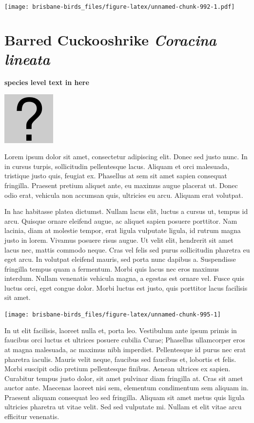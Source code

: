 \documentclass[]{book}
\let\origfigure\figure
\let\endorigfigure\endfigure
\renewenvironment{figure}[1][2] {
  \expandafter\origfigure\expandafter[H]
} {
  \endorigfigure
}
\begin{document}
\texttt{[image: brisbane-birds\_files/figure-latex/unnamed-chunk-992-1.pdf]}

\section{\texorpdfstring{Barred Cuckooshrike \emph{Coracina
lineata}}{Barred Cuckooshrike Coracina lineata}}\label{barred-cuckooshrike-coracina-lineata}

\textbf{species level text in here}

\begin{figure}
\centering
\includegraphics{assets/missing.png}
\caption{No image for species}
\end{figure}

Lorem ipsum dolor sit amet, consectetur adipiscing elit. Donec sed justo
nunc. In in cursus turpis, sollicitudin pellentesque lacus. Aliquam et
orci malesuada, tristique justo quis, feugiat ex. Phasellus at sem sit
amet sapien consequat fringilla. Praesent pretium aliquet ante, eu
maximus augue placerat ut. Donec odio erat, vehicula non accumsan quis,
ultricies eu arcu. Aliquam erat volutpat.

In hac habitasse platea dictumst. Nullam lacus elit, luctus a cursus ut,
tempus id arcu. Quisque ornare eleifend augue, ac aliquet sapien posuere
porttitor. Nam lacinia, diam at molestie tempor, erat ligula vulputate
ligula, id rutrum magna justo in lorem. Vivamus posuere risus augue. Ut
velit elit, hendrerit sit amet lacus nec, mattis commodo neque. Cras vel
felis sed purus sollicitudin pharetra eu eget arcu. In volutpat eleifend
mauris, sed porta nunc dapibus a. Suspendisse fringilla tempus quam a
fermentum. Morbi quis lacus nec eros maximus interdum. Nullam venenatis
vehicula magna, a egestas est ornare vel. Fusce quis luctus orci, eget
congue dolor. Morbi luctus est justo, quis porttitor lacus facilisis sit
amet.

\begin{figure}
\texttt{[image: brisbane-birds\_files/figure-latex/unnamed-chunk-995-1]} \caption{insert figure caption}\label{fig:unnamed-chunk-995}
\end{figure}

In ut elit facilisis, laoreet nulla et, porta leo. Vestibulum ante ipsum
primis in faucibus orci luctus et ultrices posuere cubilia Curae;
Phasellus ullamcorper eros at magna malesuada, ac maximus nibh
imperdiet. Pellentesque id purus nec erat pharetra iaculis. Mauris velit
neque, faucibus sed faucibus et, lobortis et felis. Morbi suscipit odio
pretium pellentesque finibus. Aenean ultrices ex sapien. Curabitur
tempus justo dolor, sit amet pulvinar diam fringilla at. Cras sit amet
auctor ante. Maecenas laoreet nisi sem, elementum condimentum sem
aliquam in. Praesent aliquam consequat leo sed fringilla. Aliquam sit
amet metus quis ligula ultricies pharetra ut vitae velit. Sed sed
vulputate mi. Nullam et elit vitae arcu efficitur venenatis.
\end{document}
